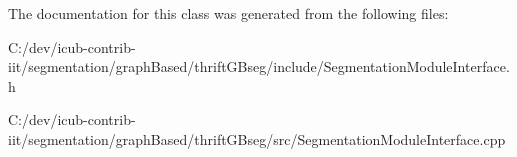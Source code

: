 The documentation for this class was generated from the following files\+:\begin{DoxyCompactItemize}
\item 
C\+:/dev/icub-\/contrib-\/iit/segmentation/graph\+Based/thrift\+G\+Bseg/include/Segmentation\+Module\+Interface.\+h\item 
C\+:/dev/icub-\/contrib-\/iit/segmentation/graph\+Based/thrift\+G\+Bseg/src/Segmentation\+Module\+Interface.\+cpp\end{DoxyCompactItemize}
